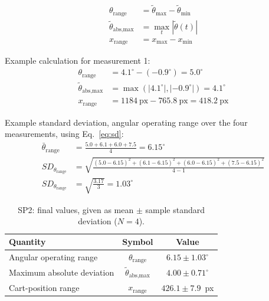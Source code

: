 \documentclass[11pt,a4paper]{article}
\begin{document}
\begin{align}
\theta_\text{range} &= \tilde{\theta}_\text{max} - \tilde{\theta}_\text{min} \label{eq:thrange} \\
\tilde{\theta}_\text{abs,max} &= \max_t |\tilde{\theta}(t)| \label{eq:thabs} \\
x_\text{range} &= x_\text{max} - x_\text{min} \label{eq:xrange}
\end{align}

Example calculation for measurement 1:
\begin{align*}
\theta_\text{range} &= 4.1^\circ - (-0.9^\circ) = 5.0^\circ \\
\tilde{\theta}_\text{abs,max} &= \max\left(|4.1^\circ|, |-0.9^\circ|\right) = 4.1^\circ \\
x_\text{range} &= 1184~\text{px} - 765.8~\text{px} = 418.2~\text{px}
\end{align*}

Example standard deviation, angular operating range over the four measurements, using Eq.~\eqref{eq:sd}:
\begin{align*}
\bar{\theta}_\text{range} &= \frac{5.0 + 6.1 + 6.0 + 7.5}{4} = 6.15^\circ \\
SD_{\theta_\text{range}} &= \sqrt{\frac{(5.0-6.15)^2 + (6.1-6.15)^2 + (6.0-6.15)^2 + (7.5-6.15)^2}{4-1}} \\
SD_{\theta_\text{range}} &= \sqrt{\frac{3.17}{3}} = 1.03^\circ
\end{align*}

\begin{table}[H]
    \centering
    \caption{SP2: final values, given as mean $\pm$ sample standard deviation ($N = 4$).}
    \label{tab:sp2_results}
    \renewcommand{\arraystretch}{1.6}
    \begin{tabular}{|l|c|c|}
        \hline
        \textbf{Quantity} & \textbf{Symbol} & \textbf{Value} \\
        \hline
        Angular operating range        & $\theta_\text{range}$          & $6.15 \pm 1.03^\circ$ \\ \hline
        Maximum absolute deviation     & $\tilde{\theta}_\text{abs,max}$ & $4.00 \pm 0.71^\circ$ \\ \hline
        Cart-position range            & $x_\text{range}$               & $426.1 \pm 7.9$~px \\ \hline
    \end{tabular}
\end{table}
\end{document}

